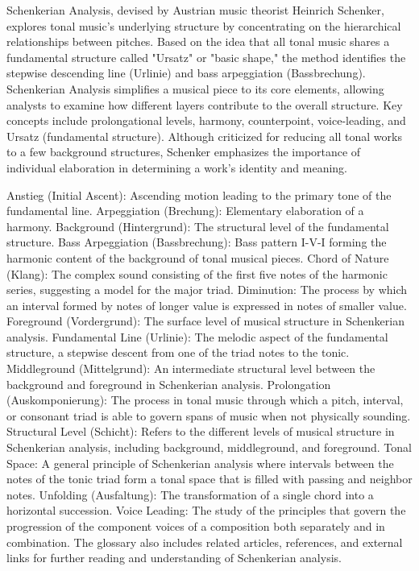 
Schenkerian Analysis, devised by Austrian music theorist Heinrich Schenker, explores tonal music's underlying structure by concentrating on the hierarchical relationships between pitches. Based on the idea that all tonal music shares a fundamental structure called "Ursatz" or "basic shape," the method identifies the stepwise descending line (Urlinie) and bass arpeggiation (Bassbrechung). Schenkerian Analysis simplifies a musical piece to its core elements, allowing analysts to examine how different layers contribute to the overall structure. Key concepts include prolongational levels, harmony, counterpoint, voice-leading, and Ursatz (fundamental structure). Although criticized for reducing all tonal works to a few background structures, Schenker emphasizes the importance of individual elaboration in determining a work's identity and meaning.


Anstieg (Initial Ascent): Ascending motion leading to the primary tone of the fundamental line.
Arpeggiation (Brechung): Elementary elaboration of a harmony.
Background (Hintergrund): The structural level of the fundamental structure.
Bass Arpeggiation (Bassbrechung): Bass pattern I-V-I forming the harmonic content of the background of tonal musical pieces.
Chord of Nature (Klang): The complex sound consisting of the first five notes of the harmonic series, suggesting a model for the major triad.
Diminution: The process by which an interval formed by notes of longer value is expressed in notes of smaller value.
Foreground (Vordergrund): The surface level of musical structure in Schenkerian analysis.
Fundamental Line (Urlinie): The melodic aspect of the fundamental structure, a stepwise descent from one of the triad notes to the tonic.
Middleground (Mittelgrund): An intermediate structural level between the background and foreground in Schenkerian analysis.
Prolongation (Auskomponierung): The process in tonal music through which a pitch, interval, or consonant triad is able to govern spans of music when not physically sounding.
Structural Level (Schicht): Refers to the different levels of musical structure in Schenkerian analysis, including background, middleground, and foreground.
Tonal Space: A general principle of Schenkerian analysis where intervals between the notes of the tonic triad form a tonal space that is filled with passing and neighbor notes.
Unfolding (Ausfaltung): The transformation of a single chord into a horizontal succession.
Voice Leading: The study of the principles that govern the progression of the component voices of a composition both separately and in combination.
The glossary also includes related articles, references, and external links for further reading and understanding of Schenkerian analysis.



